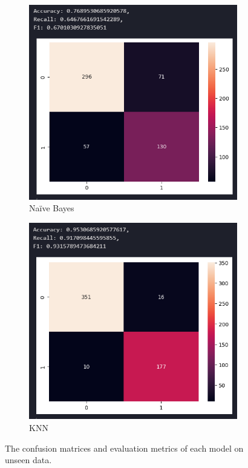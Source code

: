 \documentclass[12pt]{report}
\begin{document}
\begin{figure}[H]
    \begin{subfigure}[b]{0.45\textwidth}
        \includegraphics[width=\textwidth]{ModelDev/Iteration1/Matrices/Unseen/MetricsIncluded/NB.png}
        \caption{Na\"ive Bayes}
        \label{fig:NBUnseen}
    \end{subfigure}
    \hfill
    \begin{subfigure}[b]{0.45\textwidth}
        \includegraphics[width=\textwidth]{ModelDev/Iteration1/Matrices/Unseen/MetricsIncluded/KNN.png}
        \caption{KNN}
        \label{fig:KNNUnseen}
    \end{subfigure}
    \caption{The confusion matrices and evaluation metrics of each model on unseen data.}
    \label{fig:UnseenDataMatrices}
\end{figure}
\end{document}
